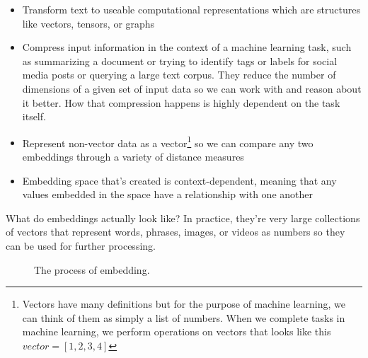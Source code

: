 \documentclass[draft, 11pt]{diazessay} %
\begin{document}
\begin{itemize}
   \item Transform text to useable computational representations which are structures like vectors, tensors, or graphs\citep{rao2019natural}
  \item Compress input information in the context of a machine learning task, such as summarizing a document or trying to identify tags or labels for social media posts or querying a large text corpus. They reduce the number of dimensions of a given set of input data so we can work with and reason about it better. How that compression happens is highly dependent on the task itself. 
  \item Represent non-vector data as a vector\footnote{Vectors have many definitions but for the purpose of machine learning, we can think of them as simply a list of numbers.  When we complete tasks in machine learning, we perform operations on vectors  that looks like this $vector = [1,2,3,4]$  } so we can compare any two embeddings through a variety of distance measures
  \item Embedding space that's created is context-dependent, meaning that any values embedded in the space have a relationship with one another
\end{itemize}

What do embeddings actually look like? In practice, they’re very large collections of vectors that represent  words, phrases, images, or videos as numbers so they can be used for further processing.   

\begin{figure}[!ht]
    \centering
    \caption{The process of embedding.}
    \label{fig:embedding}
\end{figure}
\end{document}
